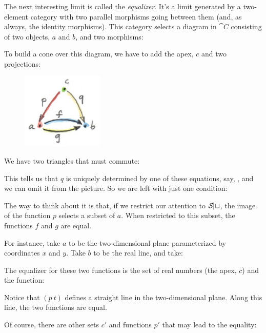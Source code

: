 The next interesting limit is called the \emph{equalizer}. It's a limit
generated by a two-element category with two parallel morphisms going
between them (and, as always, the identity morphisms). This category
selects a diagram in $\cat{C}$ consisting of two objects, $a$ and
$b$, and two morphisms:


To build a cone over this diagram, we have to add the apex, $c$
and two projections:


\begin{figure}[H]
\centering
\includegraphics[width=0.35\textwidth]{images/equalizercone.jpg}
\end{figure}

\noindent
We have two triangles that must commute:


This tells us that $q$ is uniquely determined by one of these
equations, say, , and we can omit it from the
picture. So we are left with just one condition:


The way to think about it is that, if we restrict our attention to
$\mathcal{S\mkern-3mu et}$, the image of the function $p$ selects a subset of
$a$. When restricted to this subset, the functions $f$ and
$g$ are equal.

For instance, take $a$ to be the two-dimensional plane
parameterized by coordinates $x$ and $y$. Take $b$
to be the real line, and take:


The equalizer for these two functions is the set of real numbers (the
apex, $c$) and the function:


Notice that $(p~t)$ defines a straight line in the
two-dimensional plane. Along this line, the two functions are equal.

Of course, there are other sets $c'$ and functions
$p'$ that may lead to the equality:

